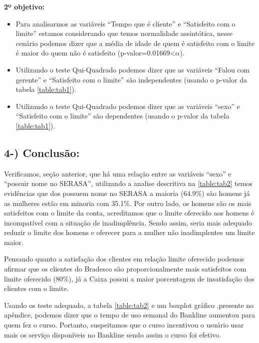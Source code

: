 \documentclass[]{article}
\providecommand{\tightlist}{%
  \setlength{\itemsep}{0pt}\setlength{\parskip}{0pt}}
\begin{document}
\textbf{2º objetivo:}

\begin{itemize}
\tightlist
\item
  Para analisarmos as variáveis ``Tempo que é cliente'' e ``Satisfeito
  com o limite'' estamos considerando que temos normalidade assintótica,
  nesse cenário podemos dizer que a média de idade de quem é satisfeito
  com o limite é maior do quem não é satisfeito
  (p-valor=0.01669\textless{}\(\alpha\)).
\item
  Utilizando o teste Qui-Quadrado podemos dizer que as variáveis ``Falou
  com gerente'' e ``Satisfeito com o limite'' são independentes (usando
  o p-valor da tabela \ref{table:tab1}).
\item
  Utilizando o teste Qui-Quadrado podemos dizer que as variáveis
  ``sexo'' e ``Satisfeito com o limite'' são dependentes (usando o
  p-valor da tabela \ref{table:tab1}).
\end{itemize}

\pagebreak

\subsection{4-) Conclusão:}\label{conclusao}

Verificamos, seção anterior, que há uma relação entre as variáveis
``sexo'' e ``possuir nome no SERASA'', utilizando a analise descritiva
na \ref{table:tab2} temos evidências que dos possuem nome no SERASA a
maioria (64.9\%) são homens já as mulheres estão em minoria com 35.1\%.
Por outro lado, os homens são os mais satisfeitos com o limite da conta,
acreditamos que o limite oferecido aos homens é incompatível com a
situação de inadimplência. Sendo assim, seria mais adequado reduzir o
limite dos homens e oferecer para a mulher não inadimplentes um limite
maior.

Pensando quanto a satisfação dos clientes em relação limite oferecido
podemos afirmar que os clientes do Bradesco são proporcionalmente mais
satisfeitos com limite oferecido (80\%), já a Caixa possui a maior
porcentagem de insatisfação dos clientes com o limite.

Usando os teste adequado, a tabela \ref{table:tab2} e um boxplot gráfico
,presente no apêndice, podemos dizer que o tempo de uso semanal do
Bankline aumentou para quem fez o curso. Portanto, suspeitamos que o
curso incentivou o usuário usar mais os serviço disponíveis no Bankline
sendo assim o curso foi efetivo.

\pagebreak 
\end{document}
